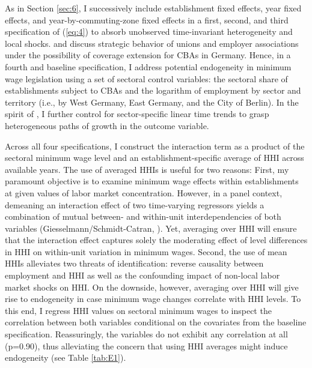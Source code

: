 \documentclass[11pt,oneside,reqno,xcolor=dvipsnames]{article} %
\begin{document}
As in Section \ref{sec:6}, I successively include establishment fixed effects, year fixed effects, and year-by-commuting-zone fixed effects in a first, second, and third specification of (\ref{eq:4}) to absorb unobserved time-invariant heterogeneity and local shocks. \citet{HaucapEtAl2011} and \citet{BachmannEtAl2014} discuss strategic behavior of unions and employer associations under the possibility of coverage extension for CBAs in Germany. Hence, in a fourth and baseline specification, I address potential endogeneity in minimum wage legislation using a set of sectoral control variables: the sectoral share of establishments subject to CBAs and the logarithm of employment by sector and territory (i.e., by West Germany, East Germany, and the City of Berlin). In the spirit of \citet{AllegrettoEtAl2011}, I further control for sector-specific linear time trends to grasp heterogeneous paths of growth in the outcome variable.




Across all four specifications, I construct the interaction term as a product of the sectoral minimum wage level and an establishment-specific average of HHI across available years. The use of averaged HHIs is useful for two reasons: First, my paramount objective is to examine minimum wage effects within establishments at given values of labor market concentration. However, in a panel context, demeaning an interaction effect of two time-varying regressors yields a combination of mutual between- and within-unit interdependencies of both variables (Giesselmann/Schmidt-Catran, \citeyear{GiesselmannSchmidtCatran2020}). Yet, averaging over HHI will ensure that the interaction effect captures solely the moderating effect of level differences in HHI on within-unit variation in minimum wages. Second, the use of mean HHIs alleviates two threats of identification: reverse causality between employment and HHI as well as the confounding impact of non-local labor market shocks on HHI. On the downside, however, averaging over HHI will give rise to endogeneity in case minimum wage changes correlate with HHI levels. To this end, I regress HHI values on sectoral minimum wages to inspect the correlation between both variables conditional on the covariates from the baseline specification. Reassuringly, the variables do not exhibit any correlation at all (p=0.90), thus alleviating the concern that using HHI averages might induce endogeneity (see Table \ref{tab:E1}).
\end{document}
